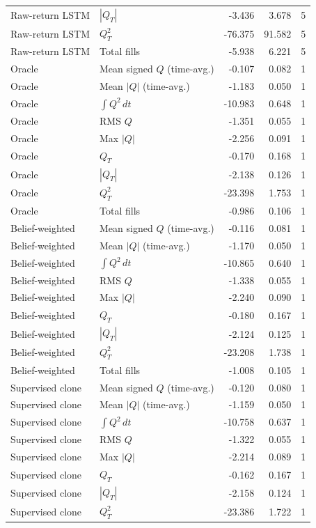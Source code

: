 \begin{table}[ht]
\begin{tabular}{llrrr}
Raw-return LSTM & $|Q_T|$ & -3.436 & 3.678 & 5 \\
Raw-return LSTM & $Q_T^2$ & -76.375 & 91.582 & 5 \\
Raw-return LSTM & Total fills & -5.938 & 6.221 & 5 \\
Oracle & Mean signed $Q$ (time-avg.) & -0.107 & 0.082 & 1 \\
Oracle & Mean $|Q|$ (time-avg.) & -1.183 & 0.050 & 1 \\
Oracle & $\int Q^2\,dt$ & -10.983 & 0.648 & 1 \\
Oracle & RMS $Q$ & -1.351 & 0.055 & 1 \\
Oracle & Max $|Q|$ & -2.256 & 0.091 & 1 \\
Oracle & $Q_T$ & -0.170 & 0.168 & 1 \\
Oracle & $|Q_T|$ & -2.138 & 0.126 & 1 \\
Oracle & $Q_T^2$ & -23.398 & 1.753 & 1 \\
Oracle & Total fills & -0.986 & 0.106 & 1 \\
Belief-weighted & Mean signed $Q$ (time-avg.) & -0.116 & 0.081 & 1 \\
Belief-weighted & Mean $|Q|$ (time-avg.) & -1.170 & 0.050 & 1 \\
Belief-weighted & $\int Q^2\,dt$ & -10.865 & 0.640 & 1 \\
Belief-weighted & RMS $Q$ & -1.338 & 0.055 & 1 \\
Belief-weighted & Max $|Q|$ & -2.240 & 0.090 & 1 \\
Belief-weighted & $Q_T$ & -0.180 & 0.167 & 1 \\
Belief-weighted & $|Q_T|$ & -2.124 & 0.125 & 1 \\
Belief-weighted & $Q_T^2$ & -23.208 & 1.738 & 1 \\
Belief-weighted & Total fills & -1.008 & 0.105 & 1 \\
Supervised clone & Mean signed $Q$ (time-avg.) & -0.120 & 0.080 & 1 \\
Supervised clone & Mean $|Q|$ (time-avg.) & -1.159 & 0.050 & 1 \\
Supervised clone & $\int Q^2\,dt$ & -10.758 & 0.637 & 1 \\
Supervised clone & RMS $Q$ & -1.322 & 0.055 & 1 \\
Supervised clone & Max $|Q|$ & -2.214 & 0.089 & 1 \\
Supervised clone & $Q_T$ & -0.162 & 0.167 & 1 \\
Supervised clone & $|Q_T|$ & -2.158 & 0.124 & 1 \\
Supervised clone & $Q_T^2$ & -23.386 & 1.722 & 1 \\

\end{tabular}
\end{table}
